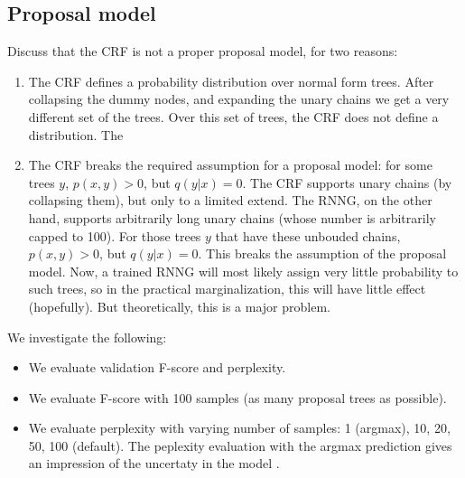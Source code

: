 \subsection{Proposal model}
  Discuss that the CRF is not a proper proposal model, for two reasons:
  \begin{enumerate}
    \item The CRF defines a probability distribution over normal form trees. After collapsing the dummy nodes, and expanding the unary chains we get a very different set of the trees. Over this set of trees, the CRF does not define a distribution. The
    \item The CRF breaks the required assumption for a proposal model: for some trees $y$, $p(x, y) > 0$, but $q(y | x) = 0$. The CRF supports unary chains (by collapsing them), but only to a limited extend. The RNNG, on the other hand, supports arbitrarily long unary chains (whose number is arbitrarily capped to 100). For those trees $y$ that have these unbouded chains, $p(x, y) > 0$, but $q(y | x) = 0$. This breaks the assumption of the proposal model. Now, a trained RNNG will most likely assign very little probability to such trees, so in the practical marginalization, this will have little effect (hopefully). But theoretically, this is a major problem.
  \end{enumerate}

  We investigate the following:
  \begin{itemize}
    \item We evaluate validation F-score and perplexity.
    \item We evaluate F-score with 100 samples (as many proposal trees as possible).
    \item We evaluate perplexity with varying number of samples: 1 (argmax), 10, 20, 50, 100 (default). The peplexity evaluation with the argmax prediction gives an impression of the uncertaty in the model \citep{buys2018exact}.
  \end{itemize}


